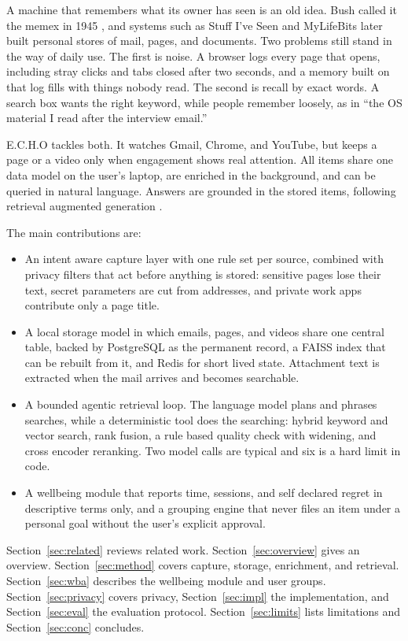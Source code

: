 \documentclass[conference]{IEEEtran}
\begin{document}
A machine that remembers what its owner has seen is an old idea. Bush called it the memex in 1945 \cite{b1}, and systems such as Stuff I've Seen \cite{b2} and MyLifeBits \cite{b3} later built personal stores of mail, pages, and documents. Two problems still stand in the way of daily use. The first is noise. A browser logs every page that opens, including stray clicks and tabs closed after two seconds, and a memory built on that log fills with things nobody read. The second is recall by exact words. A search box wants the right keyword, while people remember loosely, as in ``the OS material I read after the interview email.''

E.C.H.O tackles both. It watches Gmail, Chrome, and YouTube, but keeps a page or a video only when engagement shows real attention. All items share one data model on the user's laptop, are enriched in the background, and can be queried in natural language. Answers are grounded in the stored items, following retrieval augmented generation \cite{b4}.

The main contributions are:
\begin{itemize}
\item An intent aware capture layer with one rule set per source, combined with privacy filters that act before anything is stored: sensitive pages lose their text, secret parameters are cut from addresses, and private work apps contribute only a page title.
\item A local storage model in which emails, pages, and videos share one central table, backed by PostgreSQL as the permanent record, a FAISS index that can be rebuilt from it, and Redis for short lived state. Attachment text is extracted when the mail arrives and becomes searchable.
\item A bounded agentic retrieval loop. The language model plans and phrases searches, while a deterministic tool does the searching: hybrid keyword and vector search, rank fusion, a rule based quality check with widening, and cross encoder reranking. Two model calls are typical and six is a hard limit in code.
\item A wellbeing module that reports time, sessions, and self declared regret in descriptive terms only, and a grouping engine that never files an item under a personal goal without the user's explicit approval.
\end{itemize}

Section~\ref{sec:related} reviews related work. Section~\ref{sec:overview} gives an overview. Section~\ref{sec:method} covers capture, storage, enrichment, and retrieval. Section~\ref{sec:wba} describes the wellbeing module and user groups. Section~\ref{sec:privacy} covers privacy, Section~\ref{sec:impl} the implementation, and Section~\ref{sec:eval} the evaluation protocol. Section~\ref{sec:limits} lists limitations and Section~\ref{sec:conc} concludes.
\end{document}
